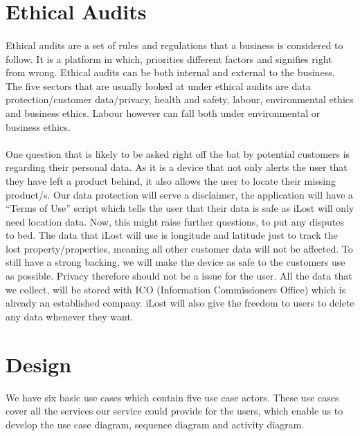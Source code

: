 \documentclass[12pt,a4paper]{article}
\begin{document}
    \section{Ethical Audits}
      \paragraph{}
        Ethical audits are a set of rules and regulations that a business is considered to follow. It is a platform in which, priorities different factors and signifies right from wrong. Ethical audits can be both internal and external to the business. The five sectors that are usually looked at under ethical audits are data protection/customer data/privacy, health and safety, labour, environmental ethics and business ethics. Labour however can fall both under environmental or business ethics.
      \paragraph{}    
        One question that is likely to be asked right off the bat by potential customers is regarding their personal data. As it is a device that not only alerts the user that they have left a product behind, it also allows the user to locate their missing product/s. Our data protection will serve a disclaimer, the application will have a “Terms of Use” script which tells the user that their data is safe as iLost will only need location data. Now, this might raise further questions, to put any disputes to bed. The data that iLost will use is longitude and latitude just to track the lost property/properties, meaning all other customer data will not be affected. To still have a strong backing, we will make the device as safe to the customers use as possible. Privacy therefore should not be a issue for the user. All the data that we collect, will be stored with ICO (Information Commissioners Office) which is already an established company. iLost will also give the freedom to users to delete any data whenever they want. 

    \section{Design}
        We have six basic use cases which contain five use case actors. These use cases cover all the services our service could provide for the users, which enable us to develop the use case diagram, sequence diagram and activity diagram.
        
\end{document}
